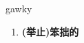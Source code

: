 
\begin{frame}
{\huge gawky}
\begin{center}
\begin{enumerate}\Large
  \item \textbf{(举止)笨拙的}
\end{enumerate}
\end{center}
\end{frame}
